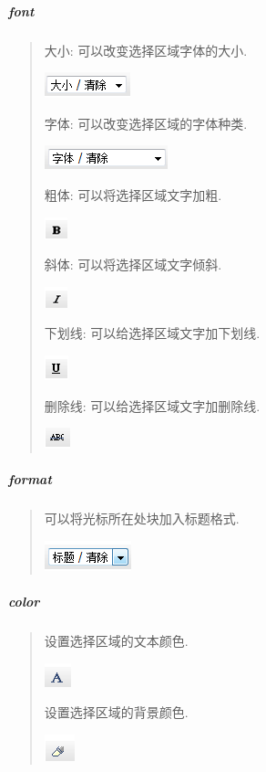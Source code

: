 \documentclass[letterpaper,10pt,english]{sphinxmanual}
\begin{document}
\subparagraph{font}
\label{relatedproj/editorguide/plugin:font}\begin{quote}

大小: 可以改变选择区域字体的大小.

\includegraphics{fontsize1.png}

字体: 可以改变选择区域的字体种类.

\includegraphics{fontfamily1.png}

粗体: 可以将选择区域文字加粗.

\includegraphics{fontbold1.png}

斜体: 可以将选择区域文字倾斜.

\includegraphics{fontitalic1.png}

下划线: 可以给选择区域文字加下划线.

\includegraphics{fontunderline1.png}

删除线: 可以给选择区域文字加删除线.

\includegraphics{fontdelete1.png}
\end{quote}


\subparagraph{format}
\label{relatedproj/editorguide/plugin:format}\begin{quote}

可以将光标所在处块加入标题格式.

\includegraphics{format1.png}
\end{quote}


\subparagraph{color}
\label{relatedproj/editorguide/plugin:color}\begin{quote}

设置选择区域的文本颜色.

\includegraphics{forecolor1.png}

设置选择区域的背景颜色.

\includegraphics{bgcolor1.png}
\end{quote}
\end{document}
